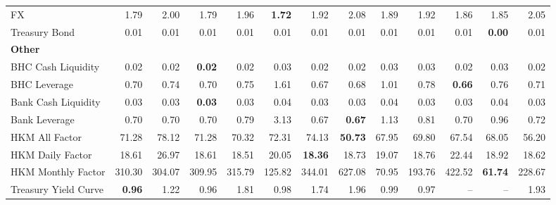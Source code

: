 \begin{tabular}{@{}lrrrrrrrrrrrr@{}}
FX & 1.79 & 2.00 & 1.79 & 1.96 & \textbf{1.72} & 1.92 & 2.08 & 1.89 & 1.92 & 1.86 & 1.85 & 2.05 \\
Treasury Bond & 0.01 & 0.01 & 0.01 & 0.01 & 0.01 & 0.01 & 0.01 & 0.01 & 0.01 & 0.01 & \textbf{0.00} & 0.01 \\
\midrule
\multicolumn{13}{l}{\textbf{Other}} \\
BHC Cash Liquidity & 0.02 & 0.02 & \textbf{0.02} & 0.02 & 0.03 & 0.02 & 0.02 & 0.03 & 0.03 & 0.02 & 0.03 & 0.02 \\
BHC Leverage & 0.70 & 0.74 & 0.70 & 0.75 & 1.61 & 0.67 & 0.68 & 1.01 & 0.78 & \textbf{0.66} & 0.76 & 0.71 \\
Bank Cash Liquidity & 0.03 & 0.03 & \textbf{0.03} & 0.03 & 0.04 & 0.03 & 0.03 & 0.04 & 0.03 & 0.03 & 0.04 & 0.03 \\
Bank Leverage & 0.70 & 0.70 & 0.70 & 0.79 & 3.13 & 0.67 & \textbf{0.67} & 1.13 & 0.81 & 0.70 & 0.96 & 0.72 \\
HKM All Factor & 71.28 & 78.12 & 71.28 & 70.32 & 72.31 & 74.13 & \textbf{50.73} & 67.95 & 69.80 & 67.54 & 68.05 & 56.20 \\
HKM Daily Factor & 18.61 & 26.97 & 18.61 & 18.51 & 20.05 & \textbf{18.36} & 18.73 & 19.07 & 18.76 & 22.44 & 18.92 & 18.62 \\
HKM Monthly Factor & 310.30 & 304.07 & 309.95 & 315.79 & 125.82 & 344.01 & 627.08 & 70.95 & 193.76 & 422.52 & \textbf{61.74} & 228.67 \\
Treasury Yield Curve & \textbf{0.96} & 1.22 & 0.96 & 1.81 & 0.98 & 1.74 & 1.96 & 0.99 & 0.97 & -- & -- & 1.93 \\
\bottomrule
\end{tabular}